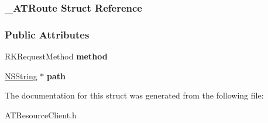 \hypertarget{struct___a_t_route}{
\subsubsection{\_\-ATRoute Struct Reference}
\label{struct___a_t_route}
}
\subsubsection*{Public Attributes}
\begin{DoxyCompactItemize}
\item 
\hypertarget{struct___a_t_route_ad49d79eead75bfa2643701487f21e467}{
RKRequestMethod {\bfseries method}}
\label{struct___a_t_route_ad49d79eead75bfa2643701487f21e467}

\item 
\hypertarget{struct___a_t_route_a5286920c5fea2d64c8cb39fecdfccfe8}{
\hyperlink{class_n_s_string}{NSString} $\ast$ {\bfseries path}}
\label{struct___a_t_route_a5286920c5fea2d64c8cb39fecdfccfe8}

\end{DoxyCompactItemize}


The documentation for this struct was generated from the following file:\begin{DoxyCompactItemize}
\item 
ATResourceClient.h\end{DoxyCompactItemize}
